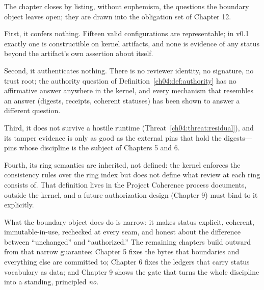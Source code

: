 The chapter closes by listing, without euphemism, the questions the boundary
object leaves open; they are drawn into the obligation set of Chapter 12.

First, it confers nothing. Fifteen valid configurations are representable;
in v0.1 exactly one is constructible on kernel artifacts, and none is
evidence of any status beyond the artifact's own assertion about itself.

Second, it authenticates nothing. There is no reviewer identity, no
signature, no trust root; the authority question of
Definition~\ref{ch04:def:authority} has no affirmative answer anywhere in
the kernel, and every mechanism that resembles an answer (digests, receipts,
coherent statuses) has been shown to answer a different question.

Third, it does not survive a hostile runtime
(Threat~\ref{ch04:threat:residual}), and its tamper evidence is only as good
as the external pins that hold the digests---pins whose discipline is the
subject of Chapters 5 and 6.

Fourth, its ring semantics are inherited, not defined: the kernel enforces
the consistency rules over the ring index but does not define what review at
each ring consists of. That definition lives in the Project Coherence
process documents, outside the kernel, and a future authorization design
(Chapter 9) must bind to it explicitly.

What the boundary object does do is narrow: it makes status explicit,
coherent, immutable-in-use, rechecked at every seam, and honest about the
difference between ``unchanged'' and ``authorized.'' The remaining chapters
build outward from that narrow guarantee: Chapter 5 fixes the bytes that
boundaries and everything else are committed to; Chapter 6 fixes the
ledgers that carry status vocabulary as data; and Chapter 9 shows the gate
that turns the whole discipline into a standing, principled \emph{no}.
